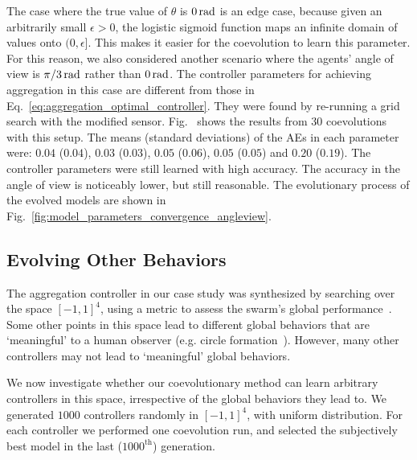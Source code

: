 The case where the true value of $\theta$ is $\unit[0]{rad}$ is an edge case, because given an arbitrarily small $\epsilon>0$, the logistic sigmoid function maps an infinite domain of values onto $(0,\epsilon]$. 
This makes it easier for the coevolution to learn this parameter. For this reason, we also considered another scenario where the agents' angle of view is $\unit[\pi/3]{rad}$ rather than $\unit[0]{rad}$. The controller parameters for achieving aggregation in this case are different from those in Eq.~\eqref{eq:aggregation_optimal_controller}. They were found by re-running a grid search with the modified sensor. Fig.~ shows the results from $30$ coevolutions with this setup. The means (standard deviations) of the AEs in each parameter were: $0.04$ ($0.04$), $0.03$ ($0.03$), $0.05$ ($0.06$), $0.05$ ($0.05$) and $0.20$ ($0.19$). The controller parameters were still learned with high accuracy. The accuracy in the angle of view is noticeably lower, but still reasonable. The evolutionary process of the evolved models are shown in Fig.~\ref{fig:model_parameters_convergence_angleview}.

\subsection{Evolving Other Behaviors}\label{sec:evolving_other_behaviors_swarm_simulation}
The aggregation controller in our case study was synthesized by searching over the space $\left[-1,1\right]^4$, using a metric to assess the swarm's global performance~\cite{Gauci2014_ijrr}. Some other points in this space lead to different global behaviors that are `meaningful' to a human observer (e.g. circle formation~\cite{Melvin_DARS2014}). However, many other controllers may not lead to `meaningful' global behaviors.

We now investigate whether our coevolutionary method can learn arbitrary controllers in this space, irrespective of the global behaviors they lead to. We generated $1000$ controllers randomly in $[-1,1]^4$, with uniform distribution. For each controller we performed one coevolution run, and selected the subjectively best model in the last ($1000^\textrm{th}$) generation. 

